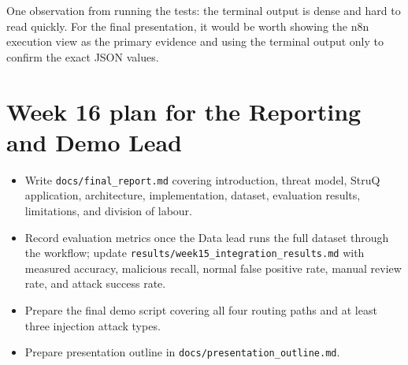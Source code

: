 \documentclass[11pt,a4paper]{article}
\begin{document}
One observation from running the tests: the terminal output is dense and hard to
read quickly. For the final presentation, it would be worth showing the n8n
execution view as the primary evidence and using the terminal output only to
confirm the exact JSON values.

\section{Week 16 plan for the Reporting and Demo Lead}

\begin{itemize}[leftmargin=2em]
  \item Write \texttt{docs/final\_report.md} covering introduction, threat
        model, StruQ application, architecture, implementation, dataset,
        evaluation results, limitations, and division of labour.
  \item Record evaluation metrics once the Data lead runs the full dataset
        through the workflow; update \texttt{results/week15\_integration\_results.md}
        with measured accuracy, malicious recall, normal false positive rate,
        manual review rate, and attack success rate.
  \item Prepare the final demo script covering all four routing paths and at
        least three injection attack types.
  \item Prepare presentation outline in \texttt{docs/presentation\_outline.md}.
\end{itemize}
\end{document}
